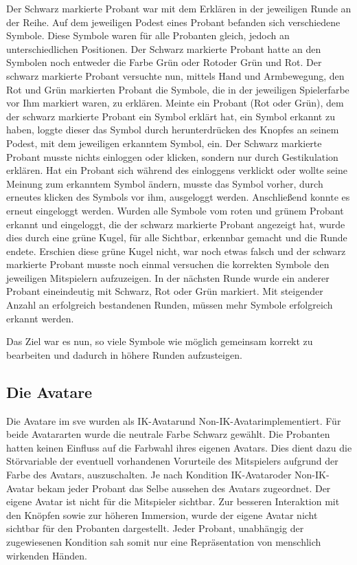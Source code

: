 \documentclass[a4paper,11pt]{article}%
\renewcommand{\\}{\vspace*{0.5\baselineskip} \newline}
\begin{document}
Der Schwarz markierte Probant war mit dem Erklären in der jeweiligen Runde an der Reihe.
Auf dem jeweiligen Podest eines Probant befanden sich verschiedene Symbole. Diese Symbole waren für alle Probanten gleich, jedoch an unterschiedlichen Positionen. Der Schwarz markierte Probant hatte an den Symbolen noch entweder die Farbe \flqq Grün oder Rot\frqq oder \flqq Grün und Rot\frqq.
Der schwarz markierte Probant versuchte nun, mittels Hand und Armbewegung, den Rot und Grün markierten Probant die Symbole, die in der jeweiligen Spielerfarbe vor Ihm markiert waren, zu erklären.
Meinte ein Probant (Rot oder Grün), dem der schwarz markierte Probant ein Symbol erklärt hat, ein Symbol erkannt zu haben, loggte dieser das Symbol durch herunterdrücken des Knopfes an seinem Podest, mit dem jeweiligen erkanntem Symbol, ein. Der Schwarz markierte Probant musste nichts einloggen oder klicken, sondern nur durch Gestikulation erklären.
Hat ein Probant sich während des einloggens verklickt oder wollte seine Meinung zum erkanntem Symbol ändern, musste das Symbol vorher, durch erneutes klicken des Symbols vor ihm, ausgeloggt werden. Anschließend konnte es erneut eingeloggt werden.
Wurden alle Symbole vom roten und grünem Probant erkannt und eingeloggt, die der schwarz markierte Probant angezeigt hat, wurde dies durch eine grüne Kugel, für alle Sichtbar, erkennbar gemacht und die Runde endete. Erschien diese grüne Kugel nicht, war noch etwas falsch und der schwarz markierte Probant musste noch einmal versuchen die korrekten Symbole den jeweiligen Mitspielern aufzuzeigen.
In der nächsten Runde wurde ein anderer Probant eineindeutig mit Schwarz, Rot oder Grün markiert.
Mit steigender Anzahl an erfolgreich bestandenen Runden, müssen mehr Symbole erfolgreich erkannt werden.

Das Ziel war es nun, so viele Symbole wie möglich gemeinsam korrekt zu bearbeiten und dadurch in höhere Runden aufzusteigen.

	\subsection{Die Avatare}
Die Avatare im \ac{sve} wurden als \flqq IK-Avatar\frqq und \flqq Non-IK-Avatar\frqq implementiert.
Für beide Avatararten wurde die neutrale Farbe Schwarz gewählt. Die Probanten hatten keinen Einfluss auf die Farbwahl ihres eigenen Avatars. Dies dient dazu die Störvariable der eventuell vorhandenen Vorurteile des Mitspielers aufgrund der Farbe des Avatars, auszuschalten. Je nach Kondition \flqq IK-Avatar\frqq oder \flqq Non-IK-Avatar \frqq bekam jeder Probant das Selbe aussehen des Avatars zugeordnet. Der eigene Avatar ist nicht für die Mitspieler sichtbar. Zur besseren Interaktion mit den Knöpfen sowie zur höheren Immersion, wurde der eigene Avatar nicht sichtbar für den Probanten dargestellt. Jeder Probant, unabhängig der zugewiesenen Kondition sah somit nur eine Repräsentation von menschlich wirkenden Händen.
\end{document}
